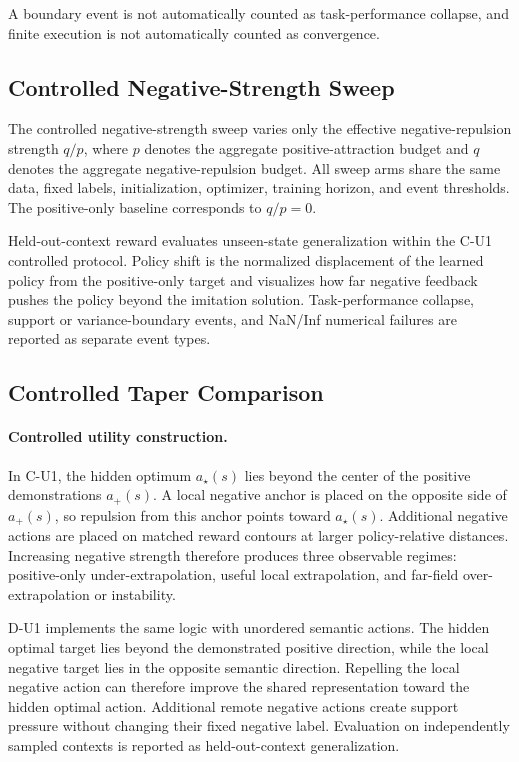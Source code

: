 A boundary event is not automatically counted as task-performance
collapse, and finite execution is not automatically counted as
convergence.

\subsection{Controlled Negative-Strength Sweep}
\label{app:negative_strength_sweep}

The controlled negative-strength sweep varies only the effective
negative-repulsion strength $q/p$, where $p$ denotes the aggregate
positive-attraction budget and $q$ denotes the aggregate
negative-repulsion budget. All sweep arms share the same data, fixed
labels, initialization, optimizer, training horizon, and event
thresholds. The positive-only baseline corresponds to $q/p=0$.

Held-out-context reward evaluates unseen-state generalization within the
C-U1 controlled protocol. Policy shift is the normalized displacement of
the learned policy from the positive-only target and visualizes how far
negative feedback pushes the policy beyond the imitation solution.
Task-performance collapse, support or variance-boundary events, and
NaN/Inf numerical failures are reported as separate event types.


\subsection{Controlled Taper Comparison}
\label{app:controlled_taper_protocol}

\paragraph{Controlled utility construction.}
In C-U1, the hidden optimum $a_\star(s)$ lies beyond the center of the
positive demonstrations $a_+(s)$. A local negative anchor is placed on
the opposite side of $a_+(s)$, so repulsion from this anchor points
toward $a_\star(s)$. Additional negative actions are placed on matched
reward contours at larger policy-relative distances. Increasing
negative strength therefore produces three observable regimes:
positive-only under-extrapolation, useful local extrapolation, and
far-field over-extrapolation or instability.

D-U1 implements the same logic with unordered semantic actions. The
hidden optimal target lies beyond the demonstrated positive direction,
while the local negative target lies in the opposite semantic
direction. Repelling the local negative action can therefore improve
the shared representation toward the hidden optimal action. Additional
remote negative actions create support pressure without changing their
fixed negative label. Evaluation on independently sampled contexts is
reported as held-out-context generalization.

